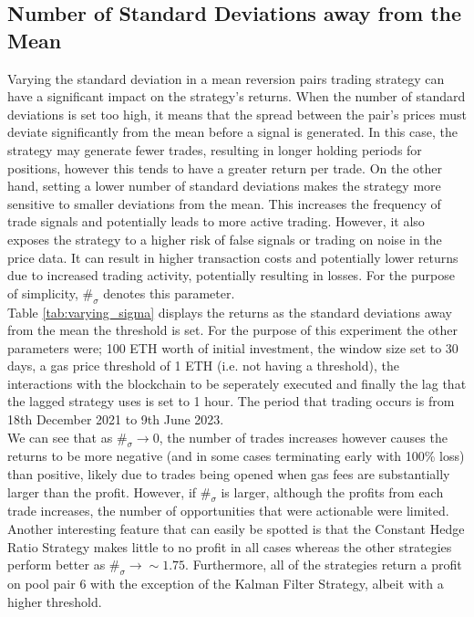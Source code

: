 \subsection{Number of Standard Deviations away from the Mean}
Varying the standard deviation in a mean reversion pairs trading strategy can have a significant impact on the strategy's returns. When the number of standard deviations is set too high, it means that the spread between the pair's prices must deviate significantly from the mean before a signal is generated. In this case, the strategy may generate fewer trades, resulting in longer holding periods for positions, however this tends to have a greater return per trade. On the other hand, setting a lower number of standard deviations makes the strategy more sensitive to smaller deviations from the mean. This increases the frequency of trade signals and potentially leads to more active trading. However, it also exposes the strategy to a higher risk of false signals or trading on noise in the price data. It can result in higher transaction costs and potentially lower returns due to increased trading activity, potentially resulting in losses. For the purpose of simplicity, $\#_{\sigma}$ denotes this parameter.
\\[5mm]
Table \ref{tab:varying_sigma} displays the returns as the standard deviations away from the mean the threshold is set. For the purpose of this experiment the other parameters were; 100 ETH worth of initial investment, the window size set to 30 days, a gas price threshold of 1 ETH (i.e. not having a threshold), the interactions with the blockchain to be seperately executed and finally the lag that the lagged strategy uses is set to 1 hour. The period that trading occurs is from 18th December 2021 to 9th June 2023.
\\[5mm]
We can see that as $\#_{\sigma} \rightarrow 0$, the number of trades increases however causes the returns to be more negative (and in some cases terminating early with 100\% loss) than positive, likely due to trades being opened when gas fees are substantially larger than the profit. However, if $\#_{\sigma}$ is larger, although the profits from each trade increases, the number of opportunities that were actionable were limited. Another interesting feature that can easily be spotted is that the Constant Hedge Ratio Strategy makes little to no profit in all cases whereas the other strategies perform better as $\#_{\sigma} \rightarrow \sim 1.75$. Furthermore, all of the strategies return a profit on pool pair 6 with the exception of the Kalman Filter Strategy, albeit with a higher threshold.
